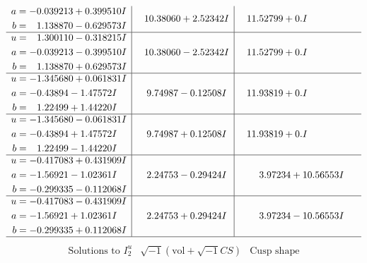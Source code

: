 \documentclass[1p]{elsarticle_modified}
\theoremstyle{definition}
\newcommand{\I}{\sqrt{-1}}
\begin{document}
$$\begin{array}{c|c|c}
\begin{aligned}
a &= -0.039213 + 0.399510 I \\
b &= \phantom{-}1.138870 - 0.629573 I\end{aligned}
 & \phantom{-}10.38060 + 2.52342 I & \phantom{-}11.52799 + 0. I\phantom{ +0.000000I} \\ \hline\begin{aligned}
u &= \phantom{-}1.300110 - 0.318215 I \\
a &= -0.039213 - 0.399510 I \\
b &= \phantom{-}1.138870 + 0.629573 I\end{aligned}
 & \phantom{-}10.38060 - 2.52342 I & \phantom{-}11.52799 + 0. I\phantom{ +0.000000I} \\ \hline\begin{aligned}
u &= -1.345680 + 0.061831 I \\
a &= -0.43894 - 1.47572 I \\
b &= \phantom{-}1.22499 + 1.44220 I\end{aligned}
 & \phantom{-}9.74987 - 0.12508 I & \phantom{-}11.93819 + 0. I\phantom{ +0.000000I} \\ \hline\begin{aligned}
u &= -1.345680 - 0.061831 I \\
a &= -0.43894 + 1.47572 I \\
b &= \phantom{-}1.22499 - 1.44220 I\end{aligned}
 & \phantom{-}9.74987 + 0.12508 I & \phantom{-}11.93819 + 0. I\phantom{ +0.000000I} \\ \hline\begin{aligned}
u &= -0.417083 + 0.431909 I \\
a &= -1.56921 - 1.02361 I \\
b &= -0.299335 - 0.112068 I\end{aligned}
 & \phantom{-}2.24753 - 0.29424 I & \phantom{-}3.97234 + 10.56553 I \\ \hline\begin{aligned}
u &= -0.417083 - 0.431909 I \\
a &= -1.56921 + 1.02361 I \\
b &= -0.299335 + 0.112068 I\end{aligned}
 & \phantom{-}2.24753 + 0.29424 I & \phantom{-}3.97234 - 10.56553 I\\
 \hline 
 \end{array}$$\newpage$$\begin{array}{c|c|c}  
\text{Solutions to }I^u_{2}& \I (\text{vol} + \sqrt{-1}CS) & \text{Cusp shape}\\

\end{array}$$
\end{document}
